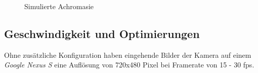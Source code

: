 \documentclass[a4paper]{article}
\begin{document}
\begin{figure}[H]
\centering
{}
\caption{Simulierte Achromasie}
\end{figure}

\newpage

\subsection*{Geschwindigkeit und Optimierungen}
Ohne zusätzliche Konfiguration haben eingehende Bilder der Kamera auf einem \textit{Google Nexus S} eine Auflösung von 720x480 Pixel bei Framerate von 15 - 30 fps.

\newpage

\nocite{ANDROID}
\nocite{GIZMODO}
\nocite{IBFB}
\printbibliography

\listoffigures

\renewcommand\listoflistingscaption{Quellcodeverzeichnis}
\listoflistings
\end{document}
